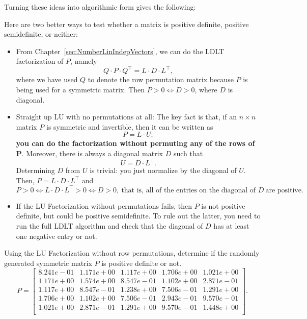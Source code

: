 \vspace*{.2cm}
Turning these ideas into algorithmic form gives the following:

\begin{tcolorbox}[sharp corners, colback=green!30, colframe=green!80!blue,  title= \textbf{\large LDLT or LU Factorization to Check ${\bf P > 0}$}]
 Here are two better ways to test whether a matrix is positive definite, positive semidefinite, or neither:
\begin{itemize}
    \item From Chapter~\ref{sec:NumberLinIndepVectors}, we can do the LDLT factorization of $P$, namely
    $$Q\cdot P \cdot Q^\top = L \cdot D \cdot L^\top, $$
    where we have used $Q$ to denote the row permutation matrix because $P$ is being used for a symmetric matrix. Then $P >0 \iff D>0$, where $D$ is diagonal. 
    \item Straight up LU with no permutations at all:  The key fact is that, if an $n \times n$ matrix $P$ is symmetric and invertible, then it can be written as
$$ P = L \cdot U;$$
\textbf{you can do the factorization without permuting any of the rows of $\mathbf{P}$}. Moreover, there is always a diagonal matrix $D$ such that
$$ U = D \cdot L^\top.$$
Determining $D$ from $U$ is trivial: you just normalize by the diagonal of $U$. Then, $P=L \cdot D \cdot L^\top$ and
$$P > 0 \iff L \cdot D \cdot L^\top>0 \iff D > 0,~\text{that is, all of the entries on the diagonal of }D~\text{are positive}. $$
\item If the LU Factorization without permutations fails, then $P$ is not positive definite, but could be positive semidefinite. To rule out the latter, you need to run the full LDLT algorithm and check that the diagonal of $D$ has at least one negative entry or not.
\end{itemize}
\end{tcolorbox}
\vspace*{.2cm}

\begin{example}
\label{ex:P0sDef02} Using the LU Factorization without row permutations, determine if the randomly generated symmetric matrix $P$ is positive definite or not.
$$ P=
\left[
\begin{array}{ccccc}
8.241e-01 & 1.171e+00 & 1.117e+00 & 1.706e+00 & 1.021e+00 \\
1.171e+00 & 1.574e+00 & 8.547e-01 & 1.102e+00 & 2.871e-01 \\
1.117e+00 & 8.547e-01 & 1.238e+00 & 7.506e-01 & 1.291e+00 \\
1.706e+00 & 1.102e+00 & 7.506e-01 & 2.943e-01 & 9.570e-01 \\
1.021e+00 & 2.871e-01 & 1.291e+00 & 9.570e-01 & 1.448e+00 \\
\end{array}
\right].$$

\end{example}


